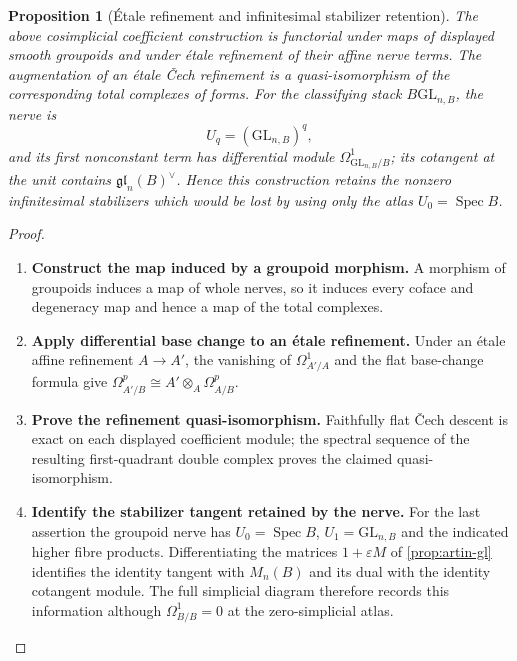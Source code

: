 \documentclass[11pt,a4paper]{article}
\numberwithin{algorithm}{section}
\numberwithin{equation}{section}
\newtheorem{proposition}[proposition]{Proposition}
\theoremstyle{definition}
\theoremstyle{remark}
\theoremstyle{plain}
\newcommand{\eps}{\varepsilon}
\theoremstyle{definition}
\theoremstyle{plain}
\begin{document}
\begin{proposition}[\'Etale refinement and infinitesimal stabilizer retention]
\label{prop:artin-derham-stabilizers}
The above cosimplicial coefficient construction is functorial
under maps of displayed smooth groupoids and under \'etale
refinement of their affine nerve terms.  The augmentation
of an \'etale \v{C}ech refinement is a quasi-isomorphism of
the corresponding total complexes of forms.  For the classifying
stack $B\mathrm{GL}_{n,B}$, the nerve is
\[
 U_q=(\mathrm{GL}_{n,B})^q,
\]
and its first nonconstant term has differential module
$\Omega^1_{\mathrm{GL}_{n,B}/B}$; its cotangent at the unit
contains $\mathfrak{gl}_n(B)^\vee$.  Hence this construction
retains the nonzero infinitesimal stabilizers which would be
lost by using only the atlas $U_0=\operatorname{Spec}B$.
\end{proposition}
\begin{proof}\leavevmode
\begin{enumerate}[leftmargin=*,align=left]
\item \textbf{Construct the map induced by a groupoid morphism.}
A morphism of groupoids induces a map of whole nerves,
so it induces every coface and degeneracy map and hence a
map of the total complexes.

\item \textbf{Apply differential base change to an \'etale refinement.}
Under an \'etale affine
refinement $A\to A'$, the vanishing of
$\Omega^1_{A'/A}$ and the flat base-change formula give
$\Omega^p_{A'/B}\cong A'\otimes_A\Omega^p_{A/B}$.

\item \textbf{Prove the refinement quasi-isomorphism.}
Faithfully flat \v{C}ech descent is exact on each displayed
coefficient module; the spectral sequence of the resulting
first-quadrant double complex proves the claimed
quasi-isomorphism.

\item \textbf{Identify the stabilizer tangent retained by the nerve.}
For the last assertion the groupoid
nerve has $U_0=\operatorname{Spec}B$,
$U_1=\mathrm{GL}_{n,B}$ and the indicated higher fibre
products.  Differentiating the matrices $1+\eps M$ of
\cref{prop:artin-gl} identifies the identity tangent with
$M_n(B)$ and its dual with the identity cotangent module.
The full simplicial diagram therefore records this
information although $\Omega^1_{B/B}=0$ at the zero-simplicial
atlas.
\end{enumerate}
\end{proof}
\end{document}
